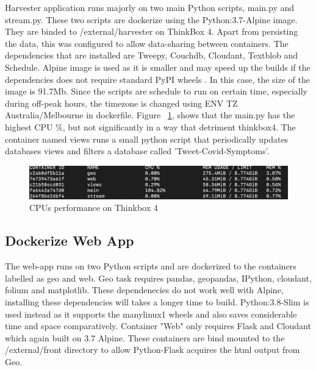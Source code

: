 Harvester application runs majorly on two main Python scripts, main.py and stream.py. These two scripts are dockerize using the Python:3.7-Alpine image. They are binded to /external/harvester on ThinkBox 4. Apart from persisting the data, this was configured to allow data-sharing between containers. The dependencies that are installed are Tweepy, Couchdb, Cloudant, Textblob and Schedule. Alpine image is used as it is smaller and may speed up the builds if the dependencies does not require standard PyPI wheels . In this case, the size of the image is 91.7Mb. Since the scripts are schedule to run on certain time, especially during off-peak hours, the timezone is changed using ENV TZ Australia/Melbourne in dockerfile. Figure ~\ref{fig:thinkbox4}, shows that the main.py has the highest CPU \%, but not significantly in a way that detriment thinkbox4. The container named views runs a small python script that periodically updates databases views and filters a database called 'Tweet-Covid-Symptoms'.

\begin{figure}[h]
\centering
\includegraphics[width=1.0\textwidth]{city_analytics/report/images/thinkboxCPU.png}

\caption{CPUs performance on Thinkbox 4}
\label{fig:thinkbox4}
\end{figure}


\subsection{Dockerize Web App}

The web-app runs on two Python scripts and are dockerized to the containers labelled as geo and web. Geo task requires pandas, geopandas, IPython, cloudant, folium and matplotlib. These dependenecies do not work well with Alpine, installing these dependencies will takes a longer time to build. Python:3.8-Slim is used instead as it supports the manylinux1 wheels and also saves considerable time and space comparatively. Container "Web" only requires Flask and Cloudant which again built on 3.7 Alpine. These containers are bind mounted to the /external/front directory to allow Python-Flask acquires the html output from Geo. 
